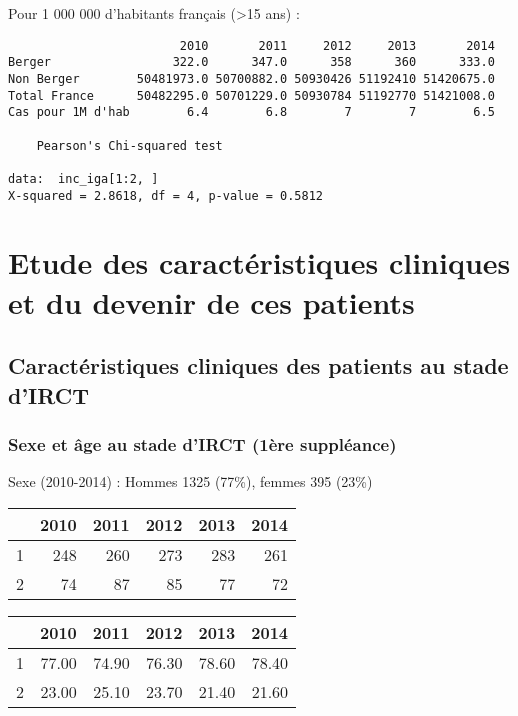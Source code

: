 \documentclass[11pt,a4paper]{article}\usepackage[]{graphicx}\usepackage[]{color}
\makeatletter
\newenvironment{kframe}{%
 \def\at@end@of@kframe{}%
 \ifinner\ifhmode%
  \def\at@end@of@kframe{\end{minipage}}%
  \begin{minipage}{\columnwidth}%
 \fi\fi%
 \def\FrameCommand##1{\hskip\@totalleftmargin \hskip-\fboxsep
 \colorbox{shadecolor}{##1}\hskip-\fboxsep
     \hskip-\linewidth \hskip-\@totalleftmargin \hskip\columnwidth}%
 \MakeFramed {\advance\hsize-\width
   \@totalleftmargin\z@ \linewidth\hsize
   \@setminipage}}%
 {\par\unskip\endMakeFramed%
 \at@end@of@kframe}
\newenvironment{knitrout}{}{} %
\makeatother
\begin{document}
Pour 1 000 000 d'habitants français (\textgreater 15 ans) :

\begin{knitrout}
\color{fgcolor}\begin{kframe}
\begin{verbatim}
                        2010       2011     2012     2013       2014
Berger                 322.0      347.0      358      360      333.0
Non Berger        50481973.0 50700882.0 50930426 51192410 51420675.0
Total France      50482295.0 50701229.0 50930784 51192770 51421008.0
Cas pour 1M d'hab        6.4        6.8        7        7        6.5

	Pearson's Chi-squared test

data:  inc_iga[1:2, ]
X-squared = 2.8618, df = 4, p-value = 0.5812
\end{verbatim}
\end{kframe}
\end{knitrout}

\section{Etude des caractéristiques cliniques et du devenir de ces patients}

  \subsection{Caractéristiques cliniques des patients au stade d’IRCT}
  
    \subsubsection{Sexe et âge au stade d’IRCT (1ère suppléance)}

Sexe (2010-2014) : Hommes 1325 (77\%), femmes 395 (23\%)
\begin{table}[ht]
\centering
\begin{tabular}{rrrrrr}
  \hline
 & 2010 & 2011 & 2012 & 2013 & 2014 \\ 
  \hline
1 & 248 & 260 & 273 & 283 & 261 \\ 
  2 &  74 &  87 &  85 &  77 &  72 \\ 
   \hline
\end{tabular}
\end{table}
\begin{table}[ht]
\centering
\begin{tabular}{rrrrrr}
  \hline
 & 2010 & 2011 & 2012 & 2013 & 2014 \\ 
  \hline
1 & 77.00 & 74.90 & 76.30 & 78.60 & 78.40 \\ 
  2 & 23.00 & 25.10 & 23.70 & 21.40 & 21.60 \\ 
   \hline
\end{tabular}
\end{table}
\end{document}
